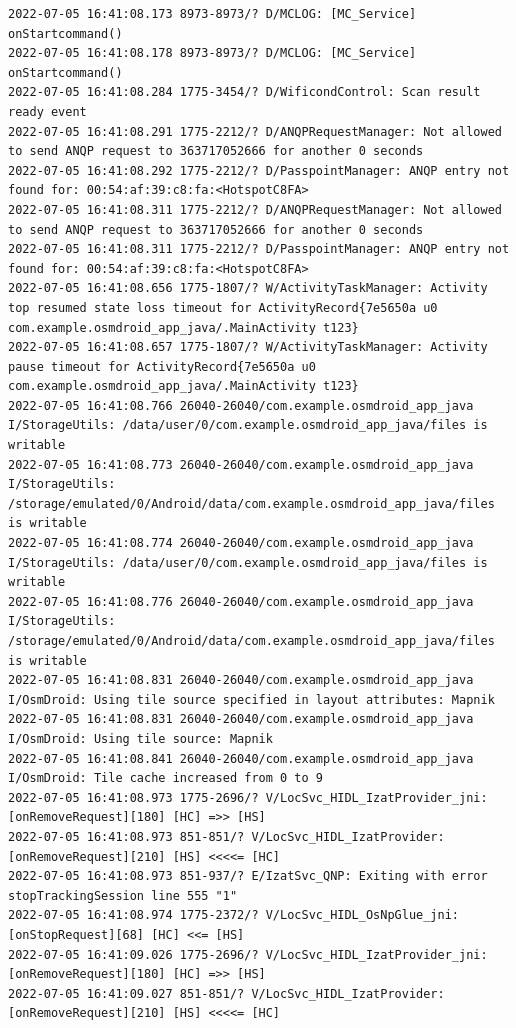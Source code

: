 \documentclass[a4paper,12pt]{book}
\begin{document}
\begin{lstlisting}
2022-07-05 16:41:08.173 8973-8973/? D/MCLOG: [MC_Service] onStartcommand()
2022-07-05 16:41:08.178 8973-8973/? D/MCLOG: [MC_Service] onStartcommand()
2022-07-05 16:41:08.284 1775-3454/? D/WificondControl: Scan result ready event
2022-07-05 16:41:08.291 1775-2212/? D/ANQPRequestManager: Not allowed to send ANQP request to 363717052666 for another 0 seconds
2022-07-05 16:41:08.292 1775-2212/? D/PasspointManager: ANQP entry not found for: 00:54:af:39:c8:fa:<HotspotC8FA>
2022-07-05 16:41:08.311 1775-2212/? D/ANQPRequestManager: Not allowed to send ANQP request to 363717052666 for another 0 seconds
2022-07-05 16:41:08.311 1775-2212/? D/PasspointManager: ANQP entry not found for: 00:54:af:39:c8:fa:<HotspotC8FA>
2022-07-05 16:41:08.656 1775-1807/? W/ActivityTaskManager: Activity top resumed state loss timeout for ActivityRecord{7e5650a u0 com.example.osmdroid_app_java/.MainActivity t123}
2022-07-05 16:41:08.657 1775-1807/? W/ActivityTaskManager: Activity pause timeout for ActivityRecord{7e5650a u0 com.example.osmdroid_app_java/.MainActivity t123}
2022-07-05 16:41:08.766 26040-26040/com.example.osmdroid_app_java I/StorageUtils: /data/user/0/com.example.osmdroid_app_java/files is writable
2022-07-05 16:41:08.773 26040-26040/com.example.osmdroid_app_java I/StorageUtils: /storage/emulated/0/Android/data/com.example.osmdroid_app_java/files is writable
2022-07-05 16:41:08.774 26040-26040/com.example.osmdroid_app_java I/StorageUtils: /data/user/0/com.example.osmdroid_app_java/files is writable
2022-07-05 16:41:08.776 26040-26040/com.example.osmdroid_app_java I/StorageUtils: /storage/emulated/0/Android/data/com.example.osmdroid_app_java/files is writable
2022-07-05 16:41:08.831 26040-26040/com.example.osmdroid_app_java I/OsmDroid: Using tile source specified in layout attributes: Mapnik
2022-07-05 16:41:08.831 26040-26040/com.example.osmdroid_app_java I/OsmDroid: Using tile source: Mapnik
2022-07-05 16:41:08.841 26040-26040/com.example.osmdroid_app_java I/OsmDroid: Tile cache increased from 0 to 9
2022-07-05 16:41:08.973 1775-2696/? V/LocSvc_HIDL_IzatProvider_jni: [onRemoveRequest][180] [HC] =>> [HS]
2022-07-05 16:41:08.973 851-851/? V/LocSvc_HIDL_IzatProvider: [onRemoveRequest][210] [HS] <<<<= [HC]
2022-07-05 16:41:08.973 851-937/? E/IzatSvc_QNP: Exiting with error stopTrackingSession line 555 "1"
2022-07-05 16:41:08.974 1775-2372/? V/LocSvc_HIDL_OsNpGlue_jni: [onStopRequest][68] [HC] <<= [HS]
2022-07-05 16:41:09.026 1775-2696/? V/LocSvc_HIDL_IzatProvider_jni: [onRemoveRequest][180] [HC] =>> [HS]
2022-07-05 16:41:09.027 851-851/? V/LocSvc_HIDL_IzatProvider: [onRemoveRequest][210] [HS] <<<<= [HC]

\end{lstlisting}
\end{document}
